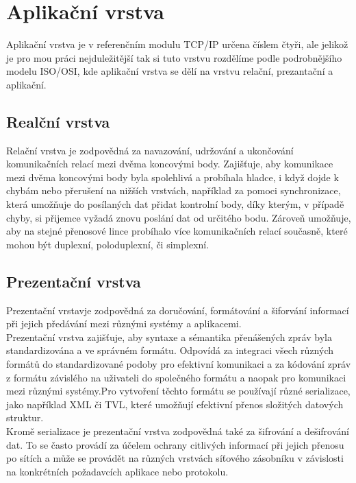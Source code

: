 \documentclass[12pt]{report}			%
\begin{document}
			\section{Aplikační  vrstva}
 Aplikační vrstva je v referenčním modulu TCP/IP určena číslem čtyři, ale jelikož je pro mou práci nejduležitější tak si tuto vrstvu rozdělíme podle podrobnějšího modelu ISO/OSI, kde aplikační vrstva se dělí na vrstvu relační, prezantační a aplikační. 
				\subsection{Realční vrstva}
Relační vrstva je zodpovědná za navazování, udržování a ukončování komunikačních relací mezi dvěma koncovými body. Zajišťuje, aby komunikace mezi dvěma koncovými body byla spolehlivá a probíhala hladce, i když dojde k chybám nebo přerušení na nižších vrstvách, například za pomoci synchronizace, která umožňuje do posílaných dat přidat kontrolní body, díky kterým, v případě chyby, si přijemce vyžadá znovu poslání dat od určitého bodu. Zároveň umožňuje, aby na stejné přenosové lince probíhalo více komunikačních relací současně, které mohou být duplexní, poloduplexní, či simplexní. \cite{session1}\cite{session2}
				\subsection{Prezentační vrstva}
Prezentační vrstavje zodpovědná za doručování, formátování a šiforvání informací při jejich předávání mezi různými systémy a aplikacemi.
\\
Prezentační vrstva zajišťuje, aby syntaxe a sémantika přenášených zpráv byla standardizována a ve správném formátu. Odpovídá za integraci všech různých formátů do standardizované podoby pro efektivní komunikaci a za kódování zpráv z formátu závislého na uživateli do společného formátu a naopak pro komunikaci mezi různými systémy.Pro vytvoření těchto formátu se používají různé serializace, jako například XML či TVL, které umožňují efektivní přenos složitých datových struktur. 
\\
Kromě serializace je prezentační vrstva zodpovědná také za šifrování a dešifrování dat. To se často provádí za účelem ochrany citlivých informací při jejich přenosu po sítích a může se provádět na různých vrstvách síťového zásobníku v závislosti na konkrétních požadavcích aplikace nebo protokolu.\cite{presentation1}\cite{presentation2}\cite{presentation3}
\end{document}
